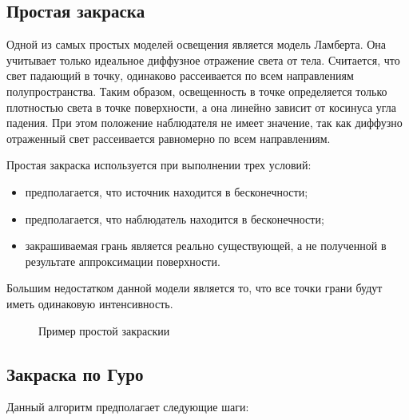 \subsection{Простая закраска}

Одной из самых простых моделей освещения является модель Ламберта. Она учитывает только идеальное диффузное отражение света от тела. Считается, что свет падающий в точку, одинаково рассеивается по всем направлениям полупространства. Таким образом, освещенность в точке определяется только плотностью света в точке поверхности, а она линейно зависит от косинуса угла падения. При этом положение наблюдателя не имеет значение, так как диффузно отраженный свет рассеивается равномерно по всем направлениям.

Простая закраска используется при выполнении трех условий:
\begin{itemize}
	\item предполагается, что источник находится в бесконечности;
	\item предполагается, что наблюдатель находится в бесконечности;
	\item закрашиваемая грань является реально существующей, а не полученной в результате аппроксимации поверхности.
\end{itemize}

Большим недостатком данной модели является то, что все точки грани будут иметь одинаковую интенсивность.

\begin{figure}[ph!]
	\caption{Пример простой закраскии}
	\label{fig:draw_simple}
\end{figure}

\subsection{Закраска по Гуро}

Данный алгоритм предполагает следующие шаги:

